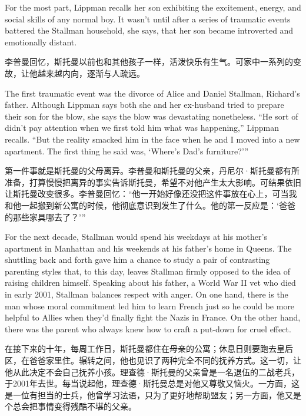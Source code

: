 \ifdefined\eng
For the most part, Lippman recalls her son exhibiting the excitement, energy, and social skills of any normal boy. It wasn't until after a series of traumatic events battered the Stallman household, she says, that her son became introverted and emotionally distant.
\fi

\ifdefined\chs
李普曼回忆，斯托曼以前也和其他孩子一样，活泼快乐有生气。可家中一系列的变故，让他越来越内向，逐渐与人疏远。
\fi

\ifdefined\eng
The first traumatic event was the divorce of Alice and Daniel Stallman, Richard's father. Although Lippman says both she and her ex-husband tried to prepare their son for the blow, she says the blow was devastating nonetheless. ``He sort of didn't pay attention when we first told him what was happening,'' Lippman recalls. ``But the reality smacked him in the face when he and I moved into a new apartment. The first thing he said was, `Where's Dad's furniture?'\hspace{0.01in}''
\fi

\ifdefined\chs
第一件事就是斯托曼的父母离异。李普曼和斯托曼的父亲，丹尼尔·斯托曼都有所准备，打算慢慢把离异的事实告诉斯托曼，希望不对他产生太大影响。可结果依旧让斯托曼改变很多。李普曼回忆：``他一开始好像还没把这件事放在心上，可当我和他一起搬到新公寓的时候，他彻底意识到发生了什么。他的第一反应是：`爸爸的那些家具哪去了？'\hspace{0.01in}''
\fi

\ifdefined\eng
For the next decade, Stallman would spend his weekdays at his mother's apartment in Manhattan and his weekends at his father's home in Queens. The shuttling back and forth gave him a chance to study a pair of contrasting parenting styles that, to this day, leaves Stallman firmly opposed to the idea of raising children himself. Speaking about his father, a World War II vet who died in early 2001, Stallman balances respect with anger. On one hand, there is the man whose moral commitment led him to learn French just so he could be more helpful to Allies when they'd finally fight the Nazis in France. On the other hand, there was the parent who always knew how to craft a put-down for cruel effect.
\fi

\ifdefined\chs
在接下来的十年，每周工作日，斯托曼都住在母亲的公寓；休息日则要跑去皇后区，在爸爸家里住。辗转之间，他也见识了两种完全不同的抚养方式。这一切，让他从此决定不会自己抚养小孩。理查德·斯托曼的父亲曾是一名退伍的二战老兵，于2001年去世。每当说起他，理查德·斯托曼总是对他又尊敬又恼火。一方面，这是一位有担当的士兵，他曾学习法语，只为了更好地帮助盟友；另一方面，他又是个总会把事情变得残酷不堪的父亲。
\fi

